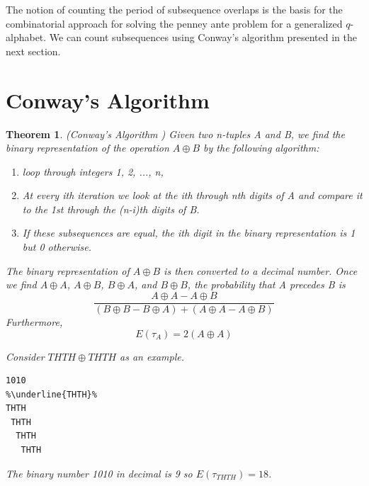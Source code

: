 \documentclass[12pt,haverford,landscape]{haverposter}
\newtheorem{theorem}{Theorem}[section]
\begin{document}
\begin{multicols}{4}
The notion of counting the period of subsequence overlaps is the basis for the combinatorial
approach for solving the penney ante problem for a generalized $q$-alphabet. We can count 
subsequences using Conway's algorithm presented in the next section.



\color{Black} %

\section{\LARGE Conway's Algorithm}

\begin{theorem}(Conway's Algorithm \cite{gardner})
	Given two n-tuples A and B, we find the binary representation of
	the operation $A \oplus B$ by the following algorithm:
	\begin{enumerate}
	\item loop through integers 1, 2, ..., n,
	\item At every ith iteration we look at the ith through nth digits of A and compare
	   it to the 1st through the (n-i)th digits of B.
	\item If these subsequences are equal, the ith digit in the binary representation is 1 but 0 otherwise.
	\end{enumerate}

The binary representation of $A \oplus B$
is then converted to a decimal number. Once we find $A \oplus A$, $A \oplus B$,
$B \oplus A$, and $B \oplus B$, the probability that A precedes B is
$$ \frac{A \oplus A - A \oplus B}{(B \oplus B - B \oplus A) + (A \oplus A - A \oplus B)} $$
Furthermore, 
$$E(\tau_A) = 2 (A\oplus A) $$ 

Consider $THTH \oplus THTH$ as an example.  
\begin{lstlisting}[escapechar=\%]
1010 
%\underline{THTH}%
THTH
 THTH
  THTH 
   THTH 
\end{lstlisting}

The binary number 1010 in decimal is 9 so $E(\tau_{THTH}) = 18$.

\end{theorem}



\end{multicols}
\end{document}
